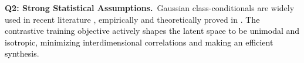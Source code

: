 \documentclass[10pt,twocolumn,letterpaper]{article}
\begin{document}
\noindent\textbf{Q2: Strong Statistical Assumptions.}~Gaussian class-conditionals are widely used in recent literature \cite{9578909, 9578909_1}, empirically and theoretically proved in \cite{betser2026infonce}. 
\textcolor{black}{The contrastive training objective actively shapes the latent space to be unimodal and isotropic, minimizing interdimensional correlations and making an efficient synthesis}.
\end{document}

